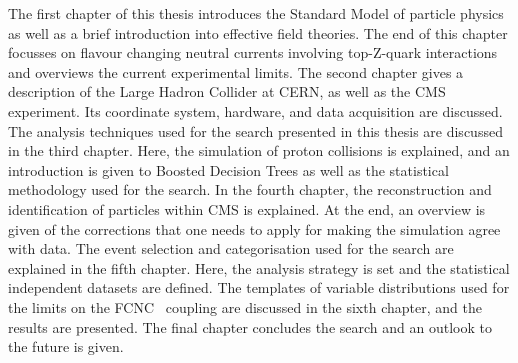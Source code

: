 The first chapter of this thesis introduces the Standard Model of particle physics as well as a brief introduction into effective field theories. The end of this chapter focusses on flavour changing neutral currents involving top-Z-quark interactions and overviews the current experimental limits.  The second chapter gives a description of the Large Hadron Collider at CERN, as well as the CMS experiment. Its coordinate system, hardware, and data acquisition are discussed. The analysis techniques used for the search  presented in this thesis are discussed in the third chapter. Here, the simulation of proton collisions is explained, and an introduction is given to Boosted Decision Trees as well as the statistical methodology used for the search. In the fourth chapter, the reconstruction and identification of particles within CMS is explained. At the end, an overview is given of the corrections that one needs to apply for making the simulation agree with data. The event selection and categorisation used for the search are explained in the fifth chapter. Here, the analysis strategy is set and the statistical independent datasets are defined. The templates of variable distributions used for the limits on the FCNC \tZq\ coupling are discussed in the sixth chapter, and the results are presented. The final chapter concludes the search and an outlook to the future is given. 